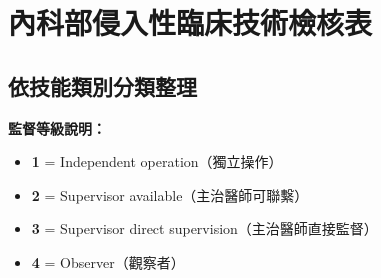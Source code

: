 \documentclass[a4paper,12pt]{article}
\begin{document}
\section*{內科部侵入性臨床技術檢核表}
\subsection*{依技能類別分類整理}

\textbf{監督等級說明：}
\begin{itemize}
\item \textbf{1} = Independent operation（獨立操作）
\item \textbf{2} = Supervisor available（主治醫師可聯繫）
\item \textbf{3} = Supervisor direct supervision（主治醫師直接監督）
\item \textbf{4} = Observer（觀察者）
\end{itemize}

\vspace{1em}
\end{document}
